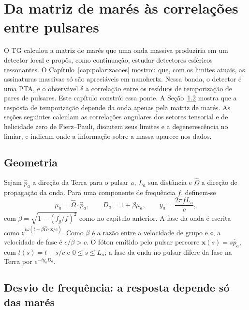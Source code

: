 \chapter{Da matriz de marés às correlações entre pulsares}
\label{cap:pta}

O TG calculou a matriz de marés que uma onda massiva produziria em um
detector local e propôs, como continuação, estudar detectores esféricos
ressonantes. O Capítulo~\ref{cap:polarizacoes} mostrou que, com os
limites atuais, as assinaturas massivas só são apreciáveis em
nanohertz. Nessa banda, o detector é uma PTA, e o observável é a
correlação entre os resíduos de temporização de pares de pulsares. Este
capítulo constrói essa ponte. A Seção~\ref{sec:pta-redshift} mostra que
a resposta de temporização depende da onda apenas pela matriz de marés.
As seções seguintes calculam as correlações angulares dos setores
tensorial e de helicidade zero de Fierz--Pauli, discutem seus limites e
a degenerescência no limiar, e indicam onde a informação sobre a massa
aparece nos dados.

\section{Geometria}

Sejam $\hat p_a$ a direção da Terra para o pulsar $a$, $L_a$ sua
distância e $\hat\Omega$ a direção de propagação da onda. Para uma
componente de frequência $f$, definem-se
\begin{equation}
 \mu_a=\hat\Omega\cdot\hat p_a,\qquad
 D_a=1+\beta\mu_a,\qquad
 y_a=\frac{2\pi fL_a}{c},
 \label{eq:pta-geometria}
\end{equation}
com $\beta=\sqrt{1-(f_g/f)^2}$ como no capítulo anterior. A fase da onda
é escrita como $e^{i\omega(t-\beta\hat\Omega\cdot\mathbf x/c)}$.
Como $\beta$ é a razão entre a velocidade de grupo e $c$, a velocidade
de fase é $c/\beta>c$. O fóton emitido pelo pulsar percorre
$\mathbf x(s)=s\hat p_a$, com $t(s)=t-s/c$ e $0\le s\le L_a$; a fase da
onda no pulsar difere da fase na Terra por $e^{-iy_aD_a}$.

\section{Desvio de frequência: a resposta depende só das marés}
\label{sec:pta-redshift}

